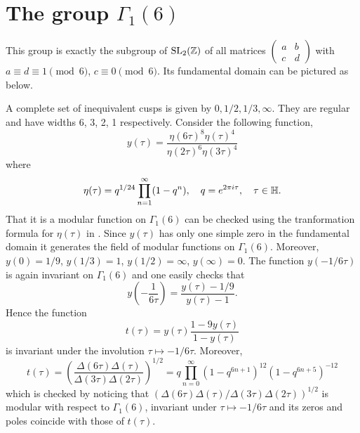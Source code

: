 \section{The group $\Gamma_1(6)$}

This group is exactly the subgroup of $\mathrm{SL}_2(\mathbb{Z})$ of all matrices $(\begin{smallmatrix}
    a & b \\ c & d
\end{smallmatrix})$ with $a \equiv d \equiv 1 \pmod{6}$, $c \equiv 0 \pmod{6}$.
Its fundamental domain can be pictured as below.

\begin{center}
\end{center}
A complete set of inequivalent cusps is given by $0, 1/2, 1/3, \infty$.
They are regular and have widths 6, 3, 2, 1 respectively.
Consider the following function,
$$
    y(\tau) = \frac{\eta(6\tau)^8 \eta(\tau)^4}{\eta(2\tau)^6 \eta(3\tau)^4}
$$
where
$$
    \eta(\tau) = q^{1/24} \prod_{n=1}^{\infty} (1 - q^n), \quad q = e^{2\pi i \tau}, \quad \tau \in \mathbb{H}.
$$
That it is a modular function on $\Gamma_1(6)$ can be checked using the tranformation formula for $\eta(\tau)$ in \cite[Ch 9]{rademacher2012topics}.
Since $y(\tau)$ has only one simple zero in the fundamental domain it generates the field of modular functions on $\Gamma_1(6)$.
Moreover, $y(0) = 1/9$, $y(1/3) = 1$, $y(1/2) = \infty$, $y(\infty) = 0$.
The function $y(-1/6\tau)$ is again invariant on $\Gamma_1(6)$ and one easily checks that
\begin{equation}
    \label{eqn:1}
    y\left(-\frac{1}{6\tau}\right) = \frac{y(\tau) - 1/9}{y(\tau) - 1}.
\end{equation}
Hence the function
$$
    t(\tau) = y(\tau) \frac{1 - 9y(\tau)}{1 - y(\tau)}
$$
is invariant under the involution $\tau \mapsto -1/6\tau$.
Moreover,
$$
    t(\tau) = \left(\frac{\Delta(6\tau) \Delta(\tau)}{\Delta(3\tau) \Delta(2\tau)}\right)^{1/2} = q \prod_{n = 0}^{\infty} (1 - q^{6n + 1})^{12} (1 - q^{6n + 5})^{-12}
$$
which is checked by noticing that $(\Delta(6\tau) \Delta(\tau) / \Delta(3\tau) \Delta(2\tau))^{1/2}$ is modular with respect to $\Gamma_1(6)$, invariant under $\tau \mapsto -1/6\tau$ and its zeros and poles coincide with those of $t(\tau)$.

